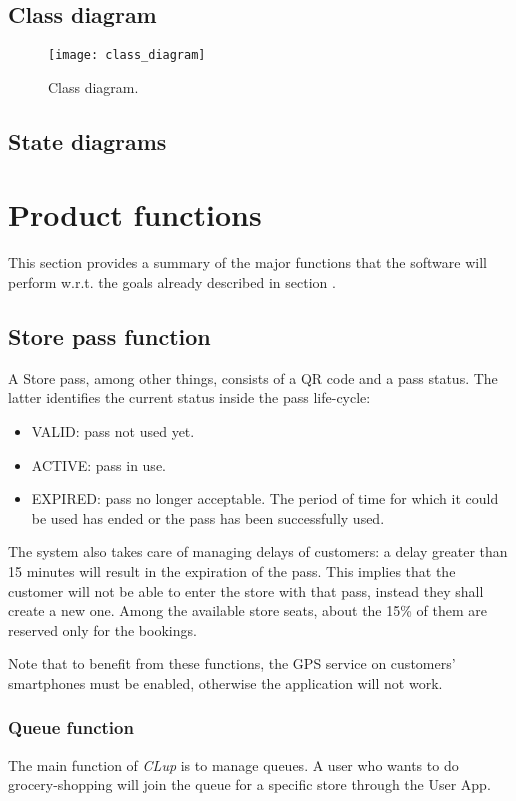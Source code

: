 \subsection{Class diagram}
\begin{figure}[H]
	\centering
	\texttt{[image: class\_diagram]}
	\caption{Class diagram.}
\end{figure}

\subsection{State diagrams}


\section{Product functions}\label{desc:prodFunc}
This section provides a summary of the major functions that the software will perform w.r.t. the goals already described in section .

\subsection{Store pass function}
	A Store pass, among other things, consists of a QR code and a pass status. The latter identifies the current status inside the pass life-cycle:
	\begin{itemize}
		\item VALID: pass not used yet.
		\item ACTIVE: pass in use.
		\item EXPIRED: pass no longer acceptable. The period of time for which it could be used has ended or the pass has been successfully used.
	\end{itemize}

	The system also takes care of managing delays of customers: a delay greater than 15 minutes will result in the expiration of the pass. This implies that the customer will not be able to enter the store with that pass, instead they shall create a new one.\newline
	Among the available store seats, about the 15\% of them are reserved only for the bookings.
	
	Note that to benefit from these functions, the GPS service on customers' smartphones must be enabled, otherwise the application will not work.

	\subsubsection{Queue function}
	The main function of \textit{CLup} is to manage queues. A user who wants to do grocery-shopping will join the queue for a specific store through the User App.\newline
	
